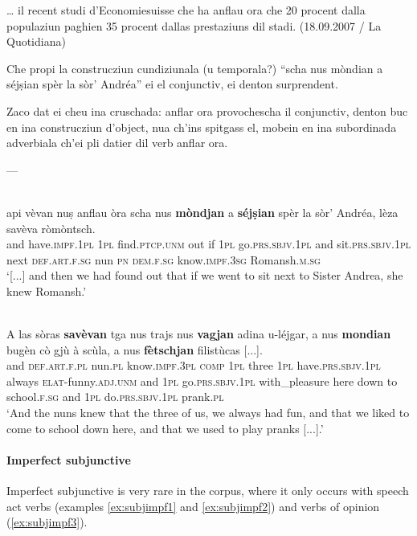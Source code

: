… il recent studi d’Economiesuisse che ha anflau ora che 20 procent dalla populaziun paghien 35 procent dallas prestaziuns dil stadi. (18.09.2007 / La Quotidiana)

Che propi la construcziun cundiziunala (u temporala?) “scha nus mòndian a séjṣian spèr la sòr’ Andréa” ei el conjunctiv, ei denton surprendent.

Zaco dat ei cheu ina cruschada: anflar ora provochescha il conjunctiv, denton buc en ina construcziun d’object, nua ch’ins spitgass el, mobein en ina subordinada adverbiala ch’ei pli datier dil verb anflar ora. 

---


\ea\label{}
\\
\gll   [...] api vèvan nuṣ anflau òra scha nus \textbf{mòndjan} a \textbf{séjṣian} spèr la sòr’ Andréa, lèza savèva ròmòntsch.\\
{} and have.\textsc{impf.1pl} \textsc{1pl}  find.\textsc{ptcp.unm} out if \textsc{1pl} go.\textsc{prs.sbjv.1pl} and sit.\textsc{prs.sbjv.1pl} next  \textsc{def.art.f.sg} nun \textsc{pn} \textsc{dem.f.sg} know.\textsc{impf.3sg} Romansh.\textsc{m.sg}\\
\glt `[...] and then we had found out that if we went to sit next to Sister Andrea, she knew Romansh.'
\z

\ea
\label{}
\\
\gll    A las sòras \textbf{savèvan} tga nus trajs nus \textbf{vagjan} adina u-léjgar, a nus \textbf{mondian} bugèn cò gjù à scùla, a nus \textbf{fètschjan} filistùcas [...].\\
and \textsc{def.art.f.pl} nun.\textsc{pl} know.\textsc{impf.3pl} \textsc{comp} \textsc{1pl} three \textsc{1pl} have.\textsc{prs.sbjv.1pl} always \textsc{elat}-funny.\textsc{adj.unm} and \textsc{1pl} go.\textsc{prs.sbjv.1pl} with\_pleasure here down to school.\textsc{f.sg} and \textsc{1pl} do.\textsc{prs.sbjv.1pl} prank.\textsc{pl}\\
\glt `And the nuns knew that the three of us, we always had fun, and that we liked to come to school down here, and that we used to play pranks [...].'
\z

\paragraph{Imperfect subjunctive}
Imperfect subjunctive is very rare in the corpus, where it only occurs with speech act verbs (examples \ref{ex:subjimpf1} and \ref{ex:subjimpf2}) and verbs of opinion (\ref{ex:subjimpf3}).

